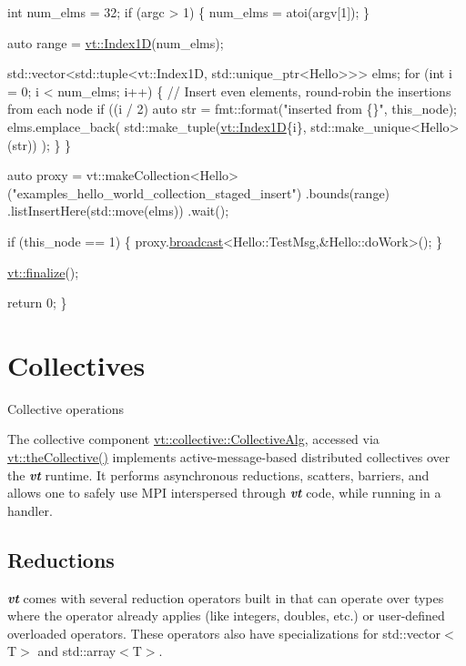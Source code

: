 \begin{DoxyCodeInclude}
  \textcolor{keywordtype}{int} num\_elms = 32;
  \textcolor{keywordflow}{if} (argc > 1) \{
    num\_elms = atoi(argv[1]);
  \}

  \textcolor{keyword}{auto} range = \hyperlink{namespacevt_a5540efc78234273e1796fb003fe4d234}{vt::Index1D}(num\_elms);

  std::vector<std::tuple<vt::Index1D, std::unique\_ptr<Hello>>> elms;
  \textcolor{keywordflow}{for} (\textcolor{keywordtype}{int} i = 0; i < num\_elms; i++) \{
    \textcolor{comment}{// Insert even elements, round-robin the insertions from each node}
    \textcolor{keywordflow}{if} ((i / 2) %
      \textcolor{keyword}{auto} str = fmt::format(\textcolor{stringliteral}{"inserted from \{\}"}, this\_node);
      elms.emplace\_back(
        std::make\_tuple(\hyperlink{structvt_1_1index_1_1_dense_index_array}{vt::Index1D}\{i\}, std::make\_unique<Hello>(str))
      );
    \}
  \}

  \textcolor{keyword}{auto} proxy = vt::makeCollection<Hello>(\textcolor{stringliteral}{"examples\_hello\_world\_collection\_staged\_insert"})
    .bounds(range)
    .listInsertHere(std::move(elms))
    .wait();

  \textcolor{keywordflow}{if} (this\_node == 1) \{
    proxy.\hyperlink{structvt_1_1objgroup_1_1proxy_1_1_proxy_a0b716ca776b1f06e0d7d45afbe9e5274}{broadcast}<Hello::TestMsg,&Hello::doWork>();
  \}

  \hyperlink{namespacevt_a540d90dbd6e97b69f1dcbc9ee9314cff}{vt::finalize}();

  \textcolor{keywordflow}{return} 0;
\}
\end{DoxyCodeInclude}
\hypertarget{collective}{}\section{Collectives}\label{collective}
Collective operations

The collective component {\ttfamily \hyperlink{structvt_1_1collective_1_1_collective_alg}{vt\+::collective\+::\+Collective\+Alg}}, accessed via {\ttfamily \hyperlink{namespacevt_aa8e0c0ab253e7ad1acd5d09e36fea769}{vt\+::the\+Collective()}} implements active-\/message-\/based distributed collectives over the {\bfseries {\itshape vt}} runtime. It performs asynchronous reductions, scatters, barriers, and allows one to safely use M\+PI interspersed through {\bfseries {\itshape vt}} code, while running in a handler.\hypertarget{collective_collective-reductions}{}\subsection{Reductions}\label{collective_collective-reductions}
{\bfseries {\itshape vt}} comes with several reduction operators built in that can operate over types where the operator already applies (like integers, doubles, etc.) or user-\/defined overloaded operators. These operators also have specializations for {\ttfamily std\+::vector$<$T$>$} and {\ttfamily std\+::array$<$T$>$}.

